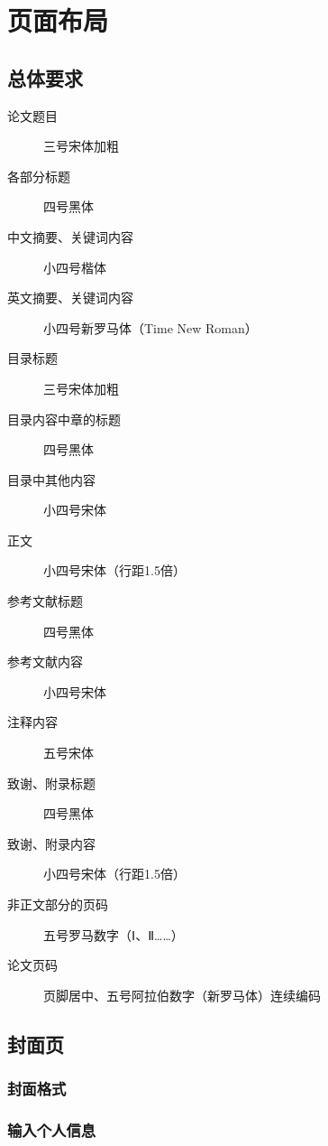 \chapter{页面布局}

\section{总体要求}

\begin{description}
    \item[论文题目] 三号宋体加粗
    \item[各部分标题] 四号黑体
    \item[中文摘要、关键词内容] 小四号楷体
    \item[英文摘要、关键词内容] 小四号新罗马体（Time New Roman）
    \item[目录标题] 三号宋体加粗
    \item[目录内容中章的标题] 四号黑体
    \item[目录中其他内容] 小四号宋体
    \item[正文] 小四号宋体（行距1.5倍）
    \item[参考文献标题] 四号黑体
    \item[参考文献内容] 小四号宋体
    \item[注释内容] 五号宋体
    \item[致谢、附录标题] 四号黑体
    \item[致谢、附录内容] 小四号宋体（行距1.5倍）
    \item[非正文部分的页码] 五号罗马数字（Ⅰ、Ⅱ……）
    \item[论文页码] 页脚居中、五号阿拉伯数字（新罗马体）连续编码
\end{description}

\section{封面页}

\subsection{封面格式}

\subsection{输入个人信息}

